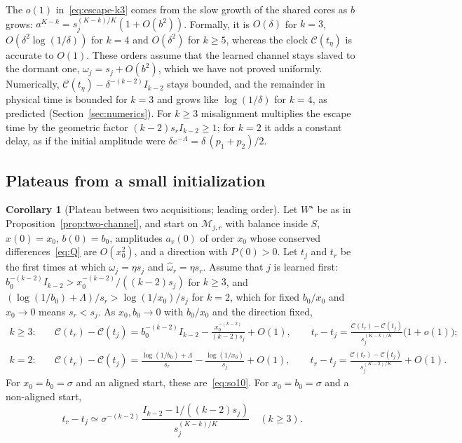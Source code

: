 \documentclass[11pt]{article}
\newcommand{\Clk}{\mathcal{C}}
\theoremstyle{definition}
\newtheorem{corollary}[theorem]{Corollary}
\numberwithin{equation}{section}
\begin{document}
The $o(1)$ in~\eqref{eq:escape-k3} comes from the slow growth of the shared cores as $b$ grows: $a^{K-k}=s_j^{(K-k)/K}(1+O(b^2))$. Formally, it is $O(\delta)$ for $k=3$, $O(\delta^2\log(1/\delta))$ for $k=4$ and $O(\delta^2)$ for $k\ge5$, whereas the clock $\Clk(t_\eta)$ is accurate to $O(1)$. These orders assume that the learned channel stays slaved to the dormant one, $\omega_j=s_j+O(b^2)$, which we have not proved uniformly. Numerically, $\Clk(t_\eta)-\delta^{-(k-2)}I_{k-2}$ stays bounded, and the remainder in physical time is bounded for $k=3$ and grows like $\log(1/\delta)$ for $k=4$, as predicted (Section~\ref{sec:numerics}). For $k\ge3$ misalignment multiplies the escape time by the geometric factor $(k-2)s_rI_{k-2}\ge1$; for $k=2$ it adds a constant delay, as if the initial amplitude were $\delta e^{-\Lambda}=\delta\,(p_1+p_2)/2$.

\subsection{Plateaus from a small initialization}

\begin{corollary}[Plateau between two acquisitions; leading order]\label{cor:plateau}
Let $W^\star$ be as in Proposition~\ref{prop:two-channel}, and start on $\mathcal M_{j,r}$ with balance inside $S$, $x(0)=x_0$, $b(0)=b_0$, amplitudes $a_v(0)$ of order $x_0$ whose conserved differences~\eqref{eq:Q} are $O(x_0^2)$, and a direction with $P(0)>0$. Let $t_j$ and $t_r$ be the first times at which $\omega_j=\eta s_j$ and $\hat\omega_r=\eta s_r$. Assume that $j$ is learned first: $b_0^{-(k-2)}I_{k-2}>x_0^{-(k-2)}/((k-2)s_j)$ for $k\ge3$, and $(\log(1/b_0)+\Lambda)/s_r>\log(1/x_0)/s_j$ for $k=2$, which for fixed $b_0/x_0$ and $x_0\to0$ means $s_r<s_j$. As $x_0,b_0\to0$ with $b_0/x_0$ and the direction fixed,
\begin{align}
k\ge3:&\quad \Clk(t_r)-\Clk(t_j)=b_0^{-(k-2)}I_{k-2}-\frac{x_0^{-(k-2)}}{(k-2)s_j}+O(1),\qquad t_r-t_j=\frac{\Clk(t_r)-\Clk(t_j)}{s_j^{(K-k)/K}}\big(1+o(1)\big);\label{eq:plateau-k3}\\
k=2:&\quad \Clk(t_r)-\Clk(t_j)=\frac{\log(1/b_0)+\Lambda}{s_r}-\frac{\log(1/x_0)}{s_j}+O(1),\qquad t_r-t_j=\frac{\Clk(t_r)-\Clk(t_j)}{s_j^{(K-2)/K}}+O(1).\label{eq:plateau-k2}
\end{align}
For $x_0=b_0=\sigma$ and an aligned start, these are~\eqref{eq:so10}. For $x_0=b_0=\sigma$ and a non-aligned start,
\begin{equation}\label{eq:plateau-nonaligned}
t_r-t_j\simeq\sigma^{-(k-2)}\,\frac{I_{k-2}-1/((k-2)s_j)}{s_j^{(K-k)/K}}\quad(k\ge3).
\end{equation}
\end{corollary}
\end{document}
